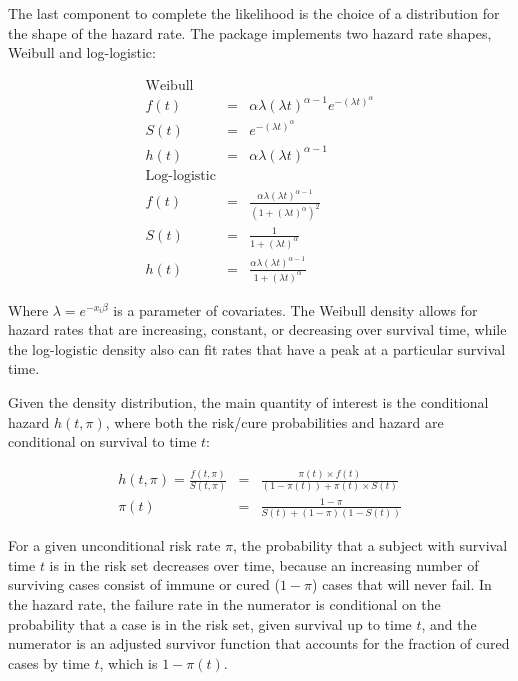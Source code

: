 The last component to complete the likelihood is the choice of a
distribution for the shape of the hazard rate. The 
package implements two hazard rate shapes, Weibull and log-logistic:

\begin{eqnarray*}
\textrm{Weibull} \\
 f(t) & = & \alpha \lambda \left(\lambda t \right)^{\alpha - 1} e^{-\left(\lambda t \right)^\alpha} \\
  S(t) & = & e^{ -\left(\lambda t \right)^\alpha } \\
 h(t) & = & \alpha \lambda \left(\lambda t \right)^{\alpha-1} \\
\textrm{Log-logistic} \\
 f(t) & = & \frac{ \alpha \lambda \left(\lambda t \right)^{\alpha-1} }{ \left(1 + (\lambda t)^\alpha \right)^2 } \\
 S(t) & = & \frac{1}{ 1+  \left(\lambda t \right)^\alpha }  \\
 h(t) & = & \frac{ \alpha \lambda \left(\lambda t \right)^{\alpha-1} }{ 1+  \left(\lambda t \right)^\alpha }
\end{eqnarray*}

Where \(\lambda = e^{-x_i\beta}\) is a parameter of covariates. The
Weibull density allows for hazard rates that are increasing, constant,
or decreasing over survival time, while the log-logistic density also
can fit rates that have a peak at a particular survival time.

Given the density distribution, the main quantity of interest is the
conditional hazard \(h(t, \pi)\), where both the risk/cure probabilities
and hazard are conditional on survival to time \(t\):

\begin{eqnarray}
h \left(t, \pi \right) = \frac{f \left(t, \pi \right)}{S \left(t, \pi \right)} & = & \frac{ \pi \left(t \right) \times f \left(t \right) }{ \left(1-\pi \left(t \right) \right) + \pi \left(t \right) \times S \left(t \right) } \\
 \pi \left(t \right) & = & \frac{ 1-\pi }{ S \left(t \right) + \left(1-\pi \right) \left(1 - S \left(t \right) \right) }
\end{eqnarray}

For a given unconditional risk rate \(\pi\), the probability that a
subject with survival time \(t\) is in the risk set decreases over time,
because an increasing number of surviving cases consist of immune or
cured (\(1-\pi\)) cases that will never fail. In the hazard rate, the
failure rate in the numerator is conditional on the probability that a
case is in the risk set, given survival up to time \(t\), and the
numerator is an adjusted survivor function that accounts for the
fraction of cured cases by time \(t\), which is \(1-\pi(t)\).


